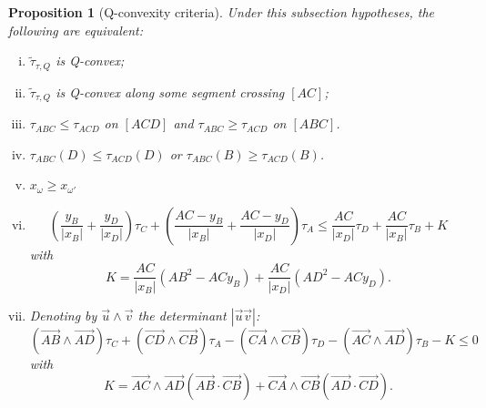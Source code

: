 \documentclass[a4paper,12pt]{article}
\newcommand{\tautilde}[2]{\widetilde\tau_{#1,#2}}
\newtheorem{prop}[lem]{Proposition}
\theoremstyle{definition}
\begin{document}
						\begin{prop}[Q-convexity criteria]\label{prop:Qconv_critere}
							Under this subsection hypotheses, the following are equivalent:
							\begin{enumerate}[(i)]
							 \item $\tautilde{\tau}{Q}$ is Q-convex;
							 \item $\tautilde{\tau}{Q}$ is Q-convex along some segment crossing $[AC]$;
							 \item $\tau_{ABC}\leq \tau_{ACD}$ on $[ACD]$ and $\tau_{ABC}\geq \tau_{ACD}$ on $[ABC]$.
							 \item $\tau_{ABC}(D)\leq \tau_{ACD}(D)$ or $\tau_{ABC}(B)\geq \tau_{ACD}(B)$.
							 
							 \item $x_{\omega}\geq x_{\omega'}$
							 \item
							 $$\left(\frac{y_B}{|x_B|}+\frac{y_D}{|x_D|}\right)\tau_C+\left(\frac{AC-y_B}{|x_B|}+\frac{AC-y_D}{|x_D|}\right)\tau_A\leq \frac{AC}{|x_D|}\tau_D+\frac{AC}{|x_B|}\tau_B+K$$
							 with
							 $$K=\frac{AC}{|x_B|}\left(AB^2-ACy_B\right)+\frac{AC}{|x_D|}\left(AD^2-ACy_D\right).$$
							\item Denoting by $\overrightarrow u\wedge \overrightarrow v$ the determinant $|\overrightarrow u \overrightarrow v|$:
							 $$\left(\overrightarrow{AB}\wedge\overrightarrow{AD}\right) \tau_C+\left(\overrightarrow{CD} \wedge\overrightarrow{CB}\right)\tau_A- \left(\overrightarrow{CA}\wedge \overrightarrow{CB}\right)\tau_D-\left(\overrightarrow{AC}\wedge \overrightarrow{AD}\right)\tau_B-K\leq 0$$
							 with
							 $$K=
							 \overrightarrow{AC}\wedge \overrightarrow{AD}
								\left(\overrightarrow{AB}\cdot \overrightarrow{CB}\right)
							 +
							 \overrightarrow{CA}\wedge \overrightarrow{CB}
								\left(\overrightarrow{AD}\cdot \overrightarrow{CD}\right)
							 .$$
							\end{enumerate}
						\end{prop}
\end{document}
